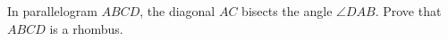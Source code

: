 In parallelogram $ABCD$, the diagonal $AC$ bisects the angle $\angle DAB$. Prove that $ABCD$ is a rhombus.
